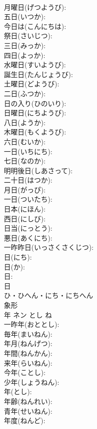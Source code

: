 \documentclass[8pt]{extreport}
\begin{document}
\begin{CJK}{UTF8}{min}
\\	月曜日(げつようび): 
\\	五日(いつか): 
\\	今日は(こんにちは): 
\\	祭日(さいじつ): 
\\	三日(みっか): 
\\	四日(よっか): 
\\	水曜日(すいようび): 
\\	誕生日(たんじょうび): 
\\	土曜日(どようび): 
\\	二日(ふつか): 
\\	日の入り(ひのいり): 
\\	日曜日(にちようび): 
\\	八日(ようか): 
\\	木曜日(もくようび): 
\\	六日(むいか): 
\\	一日(いちにち): 
\\	七日(なのか): 
\\	明明後日(しあさって): 
\\	二十日(はつか): 
\\	月日(がっぴ): 
\\	一日(ついたち): 
\\	日本(にほん): 
\\	西日(にしび): 
\\	日当(にっとう): 
\\	悪日(あくにち): 
\\	一昨昨日(いっさくさくじつ): 
\\	日(にち): 
\\	日(か): 
\\	日: 
\\	日	
\\	ひ・ひへん・にち・にちへん	
\\	象形 
\\	年	ネン	とし	ね	
\\	一昨年(おととし): 
\\	毎年(まいねん): 
\\	年月(ねんげつ): 
\\	年間(ねんかん): 
\\	来年(らいねん): 
\\	今年(ことし): 
\\	少年(しょうねん): 
\\	年(とし): 
\\	年齢(ねんれい): 
\\	青年(せいねん): 
\\	年度(ねんど): 

\end{CJK}
\end{document}
